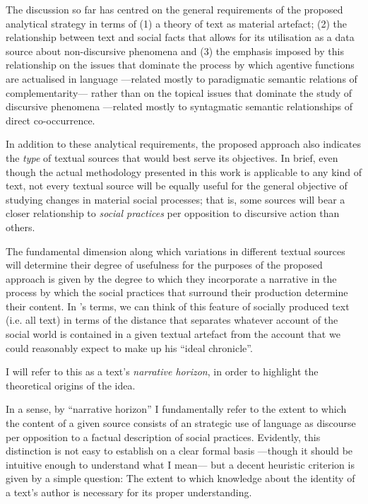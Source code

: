 The discussion so far has centred on the general requirements of the proposed analytical strategy in terms of (1) a theory of text as material artefact; (2) the relationship between text and social facts that allows for its utilisation as a data source about non-discursive phenomena and (3) the emphasis imposed by this relationship on the issues that dominate the process by which agentive functions are actualised in language ---related mostly to paradigmatic semantic relations of complementarity--- rather than on the topical issues that dominate the study of discursive phenomena ---related mostly to syntagmatic semantic relationships of direct co-occurrence.

In addition to these analytical requirements, the proposed approach also indicates the \emph{type} of textual sources that would best serve its objectives.
In brief, even though the actual methodology presented in this work is applicable to any kind of text, not every textual source will be equally useful for the general objective of studying changes in material social processes; that is, some sources will bear a closer relationship to \emph{social practices} per opposition to discursive action than others.

The fundamental dimension along which variations in different textual sources will determine their degree of usefulness for the purposes of the proposed approach is given by the degree to which they incorporate a narrative in the process by which the social practices that surround their production determine their content.
In \citeauthor{danto1985}'s terms, we can think of this feature of socially produced text (i.e. all text) in terms of the distance that separates whatever account of the social world is contained in a given textual artefact from the account that we could reasonably expect to make up his ``ideal chronicle''.

I will refer to this as a text's \emph{narrative horizon}, in order to highlight the theoretical origins of the idea.

In a sense, by ``narrative horizon'' I fundamentally refer to the extent to which the content of a given source consists of an strategic use of language as discourse per opposition to a factual description of social practices.
Evidently, this distinction is not easy to establish on a clear formal basis ---though it should be intuitive enough to understand what I mean--- but a decent heuristic criterion is given by a simple question:
The extent to which knowledge about the identity of a text's author is necessary for its proper understanding.

